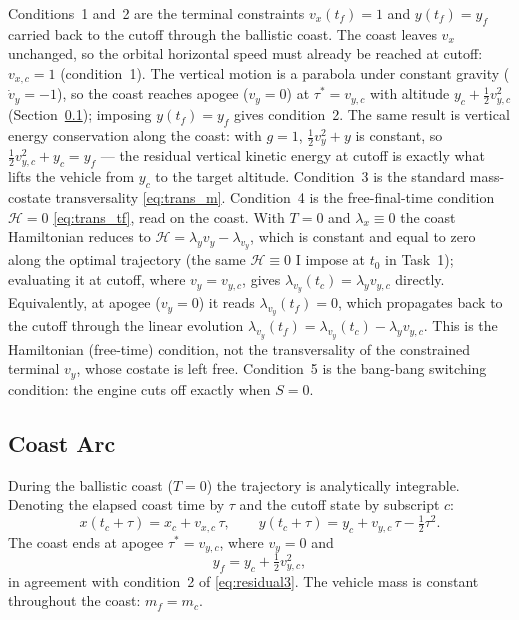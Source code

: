 \documentclass[../main.tex]{subfiles}
\begin{document}
Conditions~1 and~2 are the terminal constraints $v_x(t_f) = 1$ and $y(t_f) = y_f$ carried back to the cutoff through the ballistic coast. The coast leaves $v_x$ unchanged, so the orbital horizontal speed must already be reached at cutoff: $v_{x,c} = 1$ (condition~1). The vertical motion is a parabola under constant gravity ($\dot v_y = -1$), so the coast reaches apogee ($v_y = 0$) at $\tau^\ast = v_{y,c}$ with altitude $y_c + \tfrac{1}{2}v_{y,c}^2$ (Section~\ref{sec:coast_arc}); imposing $y(t_f) = y_f$ gives condition~2. The same result is vertical energy conservation along the coast: with $g = 1$, $\tfrac{1}{2}v_y^2 + y$ is constant, so $\tfrac{1}{2}v_{y,c}^2 + y_c = y_f$ --- the residual vertical kinetic energy at cutoff is exactly what lifts the vehicle from $y_c$ to the target altitude. Condition~3 is the standard mass-costate transversality \eqref{eq:trans_m}. Condition~4 is the free-final-time condition $\mathcal{H} = 0$ \eqref{eq:trans_tf}, read on the coast. With $T = 0$ and $\lambda_x \equiv 0$ the coast Hamiltonian reduces to $\mathcal{H} = \lambda_y v_y - \lambda_{v_y}$, which is constant and equal to zero along the optimal trajectory (the same $\mathcal{H} \equiv 0$ I impose at $t_0$ in Task~1); evaluating it at cutoff, where $v_y = v_{y,c}$, gives $\lambda_{v_y}(t_c) = \lambda_y v_{y,c}$ directly. Equivalently, at apogee ($v_y = 0$) it reads $\lambda_{v_y}(t_f) = 0$, which propagates back to the cutoff through the linear evolution $\lambda_{v_y}(t_f) = \lambda_{v_y}(t_c) - \lambda_y v_{y,c}$. This is the Hamiltonian (free-time) condition, not the transversality of the constrained terminal $v_y$, whose costate is left free. Condition~5 is the bang-bang switching condition: the engine cuts off exactly when $S = 0$.

\subsection{Coast Arc}\label{sec:coast_arc}

During the ballistic coast ($T = 0$) the trajectory is analytically integrable. Denoting the elapsed coast time by $\tau$ and the cutoff state by subscript $c$:
\begin{equation}
    x(t_c + \tau) = x_c + v_{x,c}\,\tau, \qquad
    y(t_c + \tau) = y_c + v_{y,c}\,\tau - \tfrac{1}{2}\tau^2.
\end{equation}
The coast ends at apogee $\tau^* = v_{y,c}$, where $v_y = 0$ and
\begin{equation}
    y_f = y_c + \tfrac{1}{2}v_{y,c}^2,
\end{equation}
in agreement with condition~2 of \eqref{eq:residual3}. The vehicle mass is constant throughout the coast: $m_f = m_c$.
\end{document}

